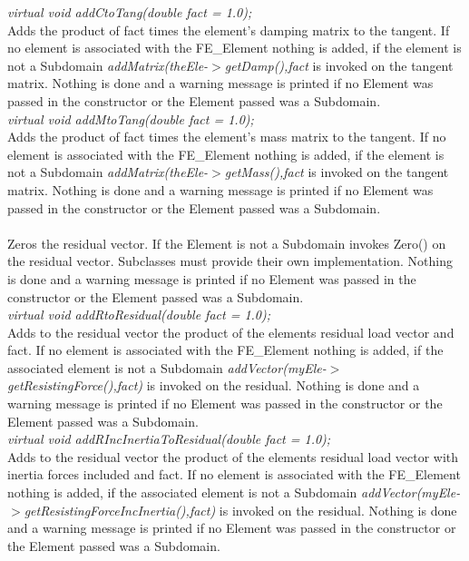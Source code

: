 {{\em virtual void addCtoTang(double fact = 1.0); }\\
Adds the product of \p fact times the element's damping
matrix to the tangent. If no element is associated with the
FE\_Element nothing is added, if the element is not a Subdomain 
{\em addMatrix(theEle-$>$getDamp(),fact} is invoked on the tangent
matrix. Nothing is done and a warning message is printed if no Element was
passed in the constructor or the Element passed was a Subdomain. \\  


{\em virtual void addMtoTang(double fact = 1.0); }\\
Adds the product of \p fact times the element's mass
matrix to the tangent. If no element is associated with the
FE\_Element nothing is added, if the element is not a Subdomain 
{\em addMatrix(theEle-$>$getMass(),fact} is invoked on the tangent
matrix. Nothing is done and a warning message is printed if no Element was
passed in the constructor or the Element passed was a Subdomain. \\  

 \\
Zeros the residual vector. If the Element is not a Subdomain invokes
Zero() on the residual vector. Subclasses must provide their own
implementation. Nothing is done and a warning message is printed if no
Element was passed in the constructor or the Element passed was a
Subdomain.\\ 


{\em virtual void addRtoResidual(double fact = 1.0); }\\
Adds to the residual vector the product of the elements residual load
vector and \p fact. If no element is associated with the
FE\_Element nothing is added, if the associated element is not a
Subdomain {\em addVector(myEle-$>$getResistingForce(),fact)} is
invoked on the residual. Nothing is done and a warning message is
printed if no Element was passed in the constructor or the Element
passed was a Subdomain. \\   

{\em virtual void addRIncInertiaToResidual(double fact = 1.0); }\\
Adds to the residual vector the product of the elements residual load
vector with inertia forces included and \p fact. If no element is
associated with the FE\_Element nothing is added, if the associated
element is not a Subdomain {\em
addVector(myEle-$>$getResistingForceIncInertia(),fact)} is 
invoked on the residual. Nothing is done and a warning message is
printed if no Element was passed in the constructor or the Element
passed was a Subdomain. \\   

}
